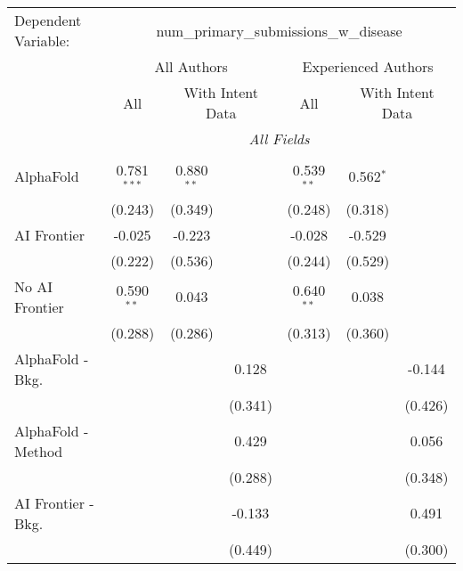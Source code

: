 \begingroup
\centering
\begin{tabular}{lcccccc}
   \tabularnewline \midrule \midrule
   Dependent Variable: & \multicolumn{6}{c}{num\_primary\_submissions\_w\_disease}\\
 & \multicolumn{3}{c}{All Authors} & \multicolumn{3}{c}{Experienced Authors} \\
\cmidrule(lr){2-4} \cmidrule(lr){5-7}
 & \multicolumn{1}{c}{All} & \multicolumn{2}{c}{With Intent Data} & \multicolumn{1}{c}{All} & \multicolumn{2}{c}{With Intent Data} \\
\cmidrule(lr){2-2} \cmidrule(lr){3-4} \cmidrule(lr){5-5} \cmidrule(lr){6-7}
 & \multicolumn{6}{c}{\textit{All Fields}} \\ \\
   AlphaFold               & 0.781$^{***}$ & 0.880$^{**}$ &             & 0.539$^{**}$ & 0.562$^{*}$ &   \\   
                           & (0.243)       & (0.349)      &             & (0.248)      & (0.318)     &   \\   
   AI Frontier             & -0.025        & -0.223       &             & -0.028       & -0.529      &   \\   
                           & (0.222)       & (0.536)      &             & (0.244)      & (0.529)     &   \\   
   No AI Frontier          & 0.590$^{**}$  & 0.043        &             & 0.640$^{**}$ & 0.038       &   \\   
                           & (0.288)       & (0.286)      &             & (0.313)      & (0.360)     &   \\   
   AlphaFold - Bkg.        &               &              & 0.128       &              &             & -0.144\\   
                           &               &              & (0.341)     &              &             & (0.426)\\   
   AlphaFold - Method      &               &              & 0.429       &              &             & 0.056\\   
                           &               &              & (0.288)     &              &             & (0.348)\\   
   AI Frontier - Bkg.      &               &              & -0.133      &              &             & 0.491\\   
                           &               &              & (0.449)     &              &             & (0.300)\\   

\end{tabular}
